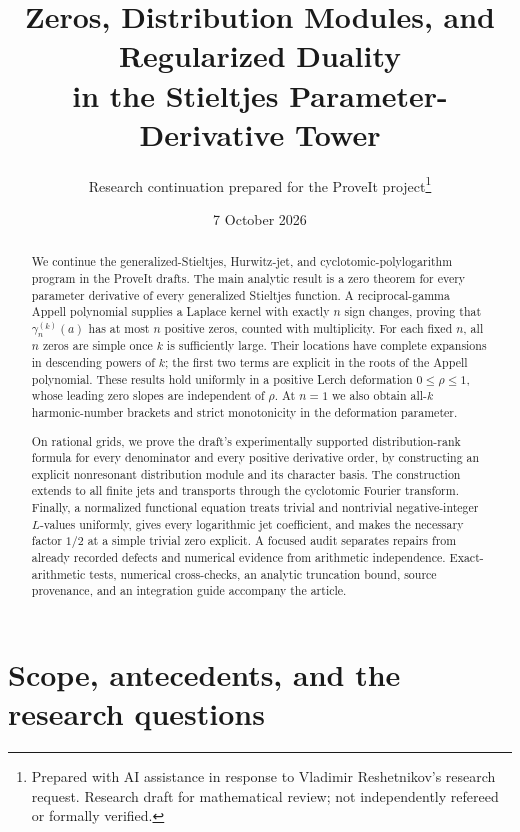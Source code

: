 \documentclass[11pt]{article}
\title{\bfseries Zeros, Distribution Modules, and Regularized Duality\\[4pt]
\large in the Stieltjes Parameter-Derivative Tower}
\author{Research continuation prepared for the ProveIt project\thanks{Prepared with AI assistance in response to Vladimir Reshetnikov's research request. Research draft for mathematical review; not independently refereed or formally verified.}}
\date{7 October 2026}
\theoremstyle{definition}
\theoremstyle{remark}
\begin{document}
\maketitle

\begin{abstract}
We continue the generalized-Stieltjes, Hurwitz-jet, and cyclotomic-polylogarithm program in the ProveIt drafts. The main analytic result is a zero theorem for every parameter derivative of every generalized Stieltjes function. A reciprocal-gamma Appell polynomial supplies a Laplace kernel with exactly $n$ sign changes, proving that $\gamma_n^{(k)}(a)$ has at most $n$ positive zeros, counted with multiplicity. For each fixed $n$, all $n$ zeros are simple once $k$ is sufficiently large. Their locations have complete expansions in descending powers of $k$; the first two terms are explicit in the roots of the Appell polynomial. These results hold uniformly in a positive Lerch deformation $0\leq\rho\leq1$, whose leading zero slopes are independent of $\rho$. At $n=1$ we also obtain all-$k$ harmonic-number brackets and strict monotonicity in the deformation parameter.

On rational grids, we prove the draft's experimentally supported distribution-rank formula for every denominator and every positive derivative order, by constructing an explicit nonresonant distribution module and its character basis. The construction extends to all finite jets and transports through the cyclotomic Fourier transform. Finally, a normalized functional equation treats trivial and nontrivial negative-integer $L$-values uniformly, gives every logarithmic jet coefficient, and makes the necessary factor $1/2$ at a simple trivial zero explicit. A focused audit separates repairs from already recorded defects and numerical evidence from arithmetic independence. Exact-arithmetic tests, numerical cross-checks, an analytic truncation bound, source provenance, and an integration guide accompany the article.
\end{abstract}

\tableofcontents
\newpage

\section{Scope, antecedents, and the research questions}
\label{sec:scope}
\end{document}
